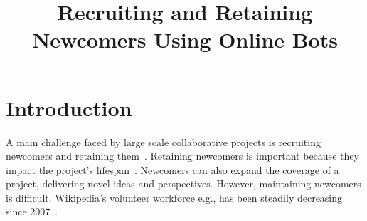 \documentclass{sigchi}
\begin{document}
\title{Recruiting and Retaining Newcomers Using Online Bots}


\maketitle




\section{Introduction}
A main challenge faced by large scale collaborative projects is recruiting newcomers and retaining them~\cite{suh2009singularity}. Retaining newcomers is important because they impact the project's lifespan~\cite{halfaker2013making}. Newcomers can also expand the coverage of a project, delivering novel ideas and perspectives. However, maintaining newcomers is  difficult. Wikipedia's volunteer workforce e.g., has been steadily decreasing since 2007~\cite{CHINOSAUR:venue}. 
\end{document}
